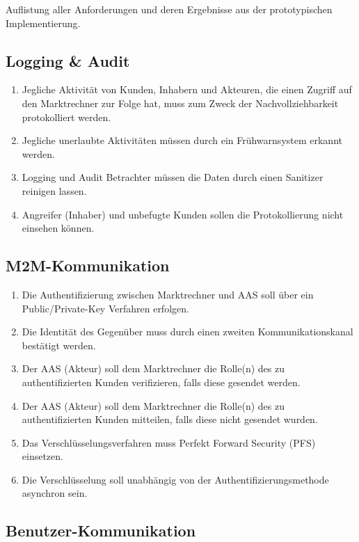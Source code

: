 \documentclass[11pt,a4paper]{report}
\begin{document}
Auflistung aller Anforderungen und deren Ergebnisse aus der prototypischen Implementierung.

\subsection{Logging \& Audit}

\begin{enumerate}
\item[\Square] Jegliche Aktivität von Kunden, Inhabern und Akteuren, die einen Zugriff auf den Marktrechner zur Folge hat, muss zum Zweck der Nachvollziehbarkeit protokolliert werden.
\item[\Square] Jegliche unerlaubte Aktivitäten müssen durch ein Frühwarnsystem erkannt werden. 
\item[\Square] Logging und Audit Betrachter müssen die Daten durch einen Sanitizer reinigen lassen. 
\item[\Square] Angreifer (Inhaber) und unbefugte Kunden sollen die Protokollierung nicht einsehen können.
\end{enumerate}

\subsection{M2M-Kommunikation}

\begin{enumerate}
\item[\Square] Die Authentifizierung zwischen Marktrechner und AAS soll über ein Public/Private-Key Verfahren erfolgen.
\item[\Square] Die Identität des Gegenüber muss durch einen zweiten Kommunikationskanal bestätigt werden.
\item[\XBox] Der AAS (Akteur) soll dem Marktrechner die Rolle(n) des zu authentifizierten Kunden verifizieren, falls diese gesendet werden.
\item[\XBox] Der AAS (Akteur) soll dem Marktrechner die Rolle(n) des zu authentifizierten Kunden mitteilen, falls diese nicht gesendet wurden.
\item[\Square] Das Verschlüsselungsverfahren muss Perfekt Forward Security (PFS) einsetzen.
\item[\Square] Die Verschlüsselung soll unabhängig von der Authentifizierungsmethode asynchron sein.
\end{enumerate}

\subsection{Benutzer-Kommunikation} 
\end{document}
